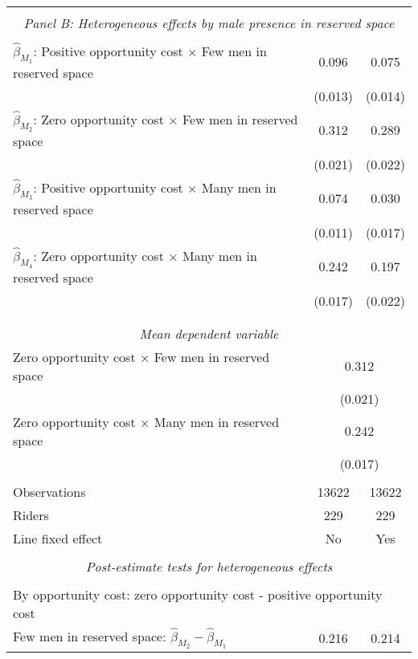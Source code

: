 \begin{tabular}{l*{2}{c}}
\hline \\[-1ex] \multicolumn{3}{c}{\textit{Panel B: Heterogeneous effects by male presence in reserved space}} \\\\[-1ex]
$\hat\beta_{M_1}$: Positive opportunity cost $\times$ Few men in reserved space&       0.096\sym{***}&       0.075\sym{***}\\
                    &     (0.013)         &     (0.014)         \\
[1em]
$\hat\beta_{M_2}$: Zero opportunity cost $\times$ Few men in reserved space&       0.312\sym{***}&       0.289\sym{***}\\
                    &     (0.021)         &     (0.022)         \\
[1em]
$\hat\beta_{M_3}$: Positive opportunity cost $\times$ Many men in reserved space&       0.074\sym{***}&       0.030\sym{*}  \\
                    &     (0.011)         &     (0.017)         \\
[1em]
$\hat\beta_{M_4}$: Zero opportunity cost $\times$ Many men in reserved space&       0.242\sym{***}&       0.197\sym{***}\\
                    &     (0.017)         &     (0.022)         \\
\\[-1.8ex] \hline \\[-1.8ex] \multicolumn{3}{c}{\textit{Mean dependent variable}} \\ Zero opportunity cost $\times$ Few men in reserved space & \multicolumn{2}{c}{0.312} \\ & \multicolumn{2}{c}{(0.021)} \\ Zero opportunity cost $\times$ Many men in reserved space & \multicolumn{2}{c}{0.242} \\ & \multicolumn{2}{c}{(0.017)} \\\\[-1ex] 
Observations        &       13622         &       13622         \\
Riders              &         229         &         229         \\
Line fixed effect   &          No         &         Yes         \\
\hline \\[-1ex]  \multicolumn{3}{c}{\textit{Post-estimate tests for heterogeneous effects}} \\\\[-1ex] \multicolumn{3}{l}{By opportunity cost: zero opportunity cost - positive opportunity cost} \\ \quad Few men in reserved space: $\hat\beta_{M_2} - \hat\beta_{M_1}$&       0.216         &       0.214         \\

\end{tabular}
